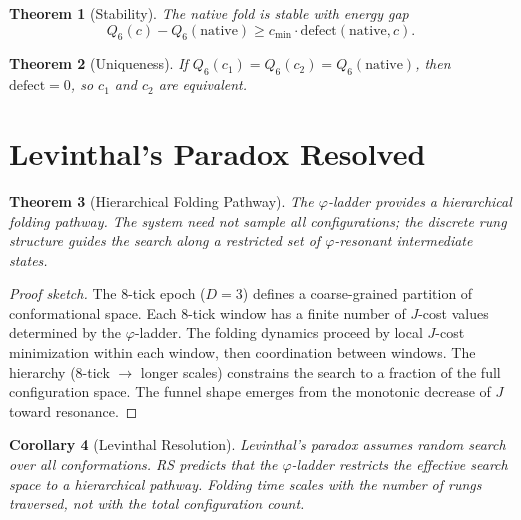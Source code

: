 \documentclass[12pt,a4paper]{article}
\newtheorem{theorem}{Theorem}[section]
\newtheorem{corollary}[theorem]{Corollary}
\theoremstyle{definition}
\theoremstyle{remark}
\begin{document}
\begin{theorem}[Stability]
\label{thm:stability}
The native fold is stable with energy gap
\begin{equation}
  Q_6(c) - Q_6(\mathrm{native}) \geq c_{\min} \cdot
  \mathrm{defect}(\mathrm{native}, c).
\end{equation}
\end{theorem}

\begin{theorem}[Uniqueness]
\label{thm:uniqueness}
If $Q_6(c_1) = Q_6(c_2) = Q_6(\mathrm{native})$, then
$\mathrm{defect} = 0$, so $c_1$ and $c_2$ are equivalent.
\end{theorem}

\section{Levinthal's Paradox Resolved}
\label{sec:levinthal}

\begin{theorem}[Hierarchical Folding Pathway]
\label{thm:levinthal}
The $\varphi$-ladder provides a hierarchical folding pathway.  The
system need not sample all configurations; the discrete rung structure
guides the search along a restricted set of $\varphi$-resonant
intermediate states.
\end{theorem}

\begin{proof}[Proof sketch]
The 8-tick epoch ($D = 3$) defines a coarse-grained partition of
conformational space.  Each 8-tick window has a finite number of
$J$-cost values determined by the $\varphi$-ladder.  The folding
dynamics proceed by local $J$-cost minimization within each window,
then coordination between windows.  The hierarchy (8-tick $\to$ longer
scales) constrains the search to a fraction of the full configuration
space.  The funnel shape emerges from the monotonic decrease of $J$
toward resonance.
\end{proof}

\begin{corollary}[Levinthal Resolution]
Levinthal's paradox assumes random search over all conformations.  RS
predicts that the $\varphi$-ladder restricts the effective search space
to a hierarchical pathway.  Folding time scales with the number of
rungs traversed, not with the total configuration count.
\end{corollary}
\end{document}
